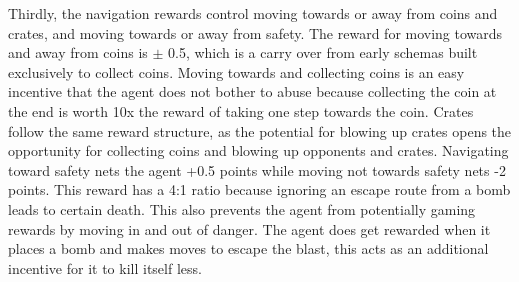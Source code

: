 \documentclass[article, 10pt]{IEEEtran}
\begin{document}
Thirdly, the navigation rewards control moving towards or away from coins and crates, and moving towards or away from safety. The reward for moving towards and away from coins is $\pm$ 0.5, which is a carry over from early schemas built exclusively to collect coins. Moving towards and collecting coins is an easy incentive that the agent does not bother to abuse because collecting the coin at the end is worth 10x the reward of taking one step towards the coin. Crates follow the same reward structure, as the potential for blowing up crates opens the opportunity for collecting coins and blowing up opponents and crates. Navigating toward safety nets the agent +0.5 points while moving not towards safety nets -2 points. This reward has a 4:1 ratio because ignoring an escape route from a bomb leads to certain death. This also prevents the agent from potentially gaming rewards by moving in and out of danger. The agent does get rewarded when it places a bomb and makes moves to escape the blast, this acts as an additional incentive for it to kill itself less.
\end{document}
